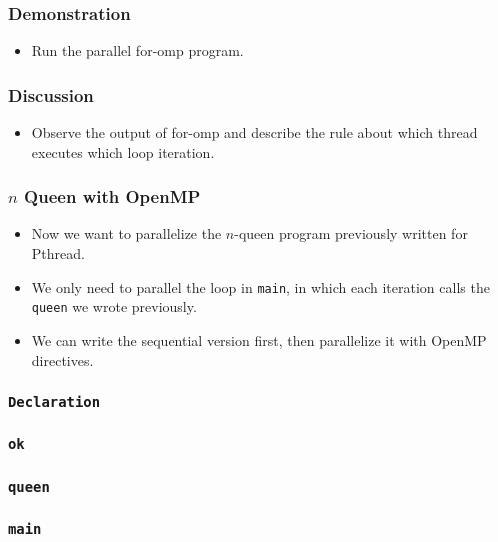 \documentclass{beamer}
\begin{document}
\begin{frame}
\frametitle{Demonstration}
\begin{itemize}
\item Run the parallel for-omp program.
\end{itemize}
\end{frame}

\begin{frame}
\frametitle{Discussion}
\begin{itemize}
\item Observe the output of for-omp and describe the rule about which
  thread executes which loop iteration.
\end{itemize}
\end{frame}

\begin{frame}
\frametitle{$n$ Queen with OpenMP}
\begin{itemize}
\item Now we want to parallelize the $n$-queen program previously
  written for Pthread.
\item We only need to parallel the loop in {\tt main}, in which each
  iteration calls the {\tt queen} we wrote previously.
\item We can write the sequential version first, then parallelize it
  with OpenMP directives.
\end{itemize}
\end{frame}


\begin{frame}
\frametitle{\tt Declaration} 
\end{frame}

\begin{frame}
\frametitle{\tt ok} 
\end{frame}

\begin{frame}
\frametitle{\tt queen} 
\end{frame}

\begin{frame}
\frametitle{\tt main} 
\end{frame}
\end{document}
